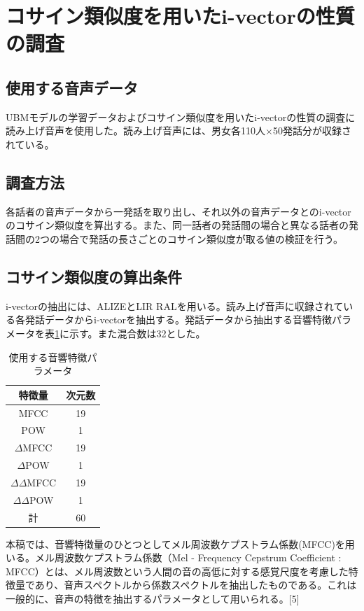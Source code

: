 \section{コサイン類似度を用いたi-vectorの性質の調査}
\label{section:pre_cos}
\subsection{使用する音声データ}
\label{section:detail_ATR}
UBMモデルの学習データおよびコサイン類似度を用いたi-vectorの性質の調査に読み上げ音声\cite{ATR}を使用した。読み上げ音声には、男女各110人$×$50発話分が収録されている。

\subsection{調査方法}
各話者の音声データから一発話を取り出し、それ以外の音声データとのi-vectorのコサイン類似度を算出する。また、同一話者の発話間の場合と異なる話者の発話間の2つの場合で発話の長さごとのコサイン類似度が取る値の検証を行う。\par

\subsection{コサイン類似度の算出条件}
i-vectorの抽出には、ALIZEとLIR RAL\cite{alize}を用いる。読み上げ音声に収録されている各発話データからi-vectorを抽出する。発話データから抽出する音響特徴パラメータを表\ref{iv_feature}に示す。また混合数は32とした。

\begin{table}[H]
  \begin{center}
    \caption{使用する音響特徴パラメータ}
    \label{iv_feature}
    \begin{tabular}{|c||c|} \hline
      特徴量 & 次元数\\ \hline
      MFCC & 19  \\ 
      POW & 1  \\ 
      $\Delta$MFCC & 19 \\ 
      $\Delta$POW & 1 \\ 
      $\Delta\Delta$MFCC & 19 \\ 
      $\Delta\Delta$POW & 1 \\ \hline
      計 & 60 \\ \hline
    \end{tabular}
  \end{center}
\end{table}

本稿では、音響特徴量のひとつとしてメル周波数ケプストラム係数(MFCC)を用いる。メル周波数ケプストラム係数（Mel - Frequency Cepstrum Coefficient : MFCC）とは、メル周波数という人間の音の高低に対する感覚尺度を考慮した特徴量であり、音声スペクトルから係数スペクトルを抽出したものである。これは一般的に、音声の特徴を抽出するパラメータとして用いられる。[5]

